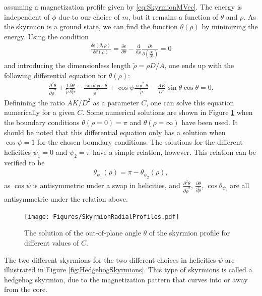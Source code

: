 \documentclass[12pt, a4paper, twoside, openright]{report}
\numberwithin{equation}{chapter}
\numberwithin{figure}{chapter}
\numberwithin{table}{chapter}
\begin{document}
assuming a magnetization profile given by \eqref{eq:SkyrmionMVec}. The energy is independent of $\phi$ due to our choice of $m$, but it remains a function of $\theta$ and $\rho$. As the skyrmion is a ground state, we can find the function $\theta(\rho)$ by minimizing the energy. Using the condition
\begin{align}
\frac{\delta\epsilon(\theta, \rho)}{\delta\theta(\rho)} = \frac{\partial\epsilon}{\partial\theta} - \frac{\textrm{d}}{\textrm{d}\rho} \frac{\partial\epsilon}{\partial (\frac{\partial\theta}{\partial \rho})} = 0
\end{align}
and introducing the dimensionless length $\tilde{\rho} = \rho D/A$, one ends up with the following differential equation for $\theta(\rho)$:
\begin{align}
\label{eq:ODEtheta}
\frac{\partial^2\theta}{\partial\tilde{\rho}^2} + \frac{1}{\tilde{\rho}}\frac{\partial\theta}{\partial\tilde{\rho}} - \frac{\sin\theta\cos\theta}{\tilde{\rho}^2}+\cos\psi\frac{\sin^2\theta}{\tilde{\rho}}-\frac{AK}{D^2}\sin\theta\cos\theta = 0.
\end{align}
Definining the ratio $AK/D^2$ as a parameter $C$, one can solve this equation numerically for a given $C$. Some numerical solutions are shown in Figure \ref{fig:ThetaProfile} when the boundary conditions $\theta(\rho = 0) = \pi$ and $\theta(\rho = \infty)$ have been used. It should be noted that this differential equation only has a solution when $\cos\psi = 1$ for the chosen boundary conditions. The solutions for the different helicities $\psi_1 = 0$ and $\psi_2 = \pi$ have a simple relation, however. This relation can be verified to be
\begin{align}
\theta_{\psi_1}(\rho) = \pi - \theta_{\psi_2}(\rho),
\end{align}
as $\cos\psi$ is antisymmetric under a swap in helicities, and $\frac{\partial^2\theta}{\partial\tilde{\rho}^2}$, $\frac{\partial\theta}{\partial\tilde{\rho}}$, $\cos\theta_{\psi_i}$ are all antisymmetric under the relation above.
\begin{figure}[h!]
\begin{center}
\texttt{[image: Figures/SkyrmionRadialProfiles.pdf]} 
\caption{The solution of the out-of-plane angle $\theta$ of the skyrmion profile for different values of $C$.}
\label{fig:ThetaProfile} 
\end{center}
\end{figure}
The two different skyrmions for the two different choices in helicities $\psi$ are illustrated in Figure \ref{fig:HedgehogSkyrmions}. This type of skyrmions is called a hedgehog skyrmion, due to the magnetization pattern that curves into or away from the core.
\end{document}
